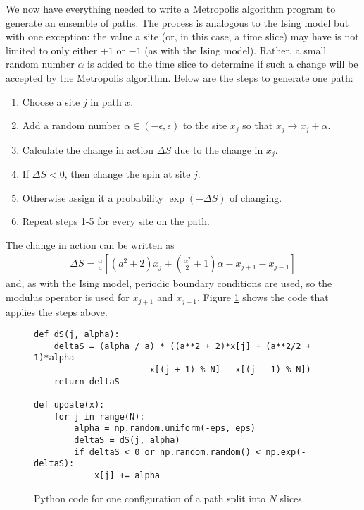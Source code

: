 \documentclass[11pt]{article}
\begin{document}
We now have everything needed to write a Metropolis algorithm program to generate an ensemble of paths. The process is analogous to the Ising model but with one exception: the value a site (or, in this case, a time slice) may have is not limited to only either $+1$ or $-1$ (as with the Ising model). Rather, a small random number $\alpha$ is added to the time slice to determine if such a change will be accepted by the Metropolis algorithm. Below are the steps to generate one path:
\begin{enumerate}
\item Choose a site $j$ in path $x$.
\item Add a random number $\alpha\in(-\epsilon,\epsilon)$ to the site $x_j$ so that $x_j\to x_j+\alpha$.
\item Calculate the change in action $\Delta S$ due to the change in $x_j$.
\item If $\Delta S<0$, then change the spin at site $j$.
\item Otherwise assign it a probability $\exp(-\Delta S)$ of changing.
\item Repeat steps 1-5 for every site on the path.
\end{enumerate}
The change in action can be written as
\begin{align}
	\Delta S= \frac{\alpha}{a}\left[(a^2+2)x_j+\left(\frac{\alpha^2}{2}+1\right)\alpha-x_{j+1}-x_{j-1}\right]
\end{align}
and, as with the Ising model, periodic boundary conditions are used, so the modulus operator is used for $x_{j+1}$ and $x_{j-1}$. Figure \ref{fig:PathCode} shows the code that applies the steps above.
\begin{figure}[h]
\begin{lstlisting}
def dS(j, alpha):
    deltaS = (alpha / a) * ((a**2 + 2)*x[j] + (a**2/2 + 1)*alpha
    				 - x[(j + 1) % N] - x[(j - 1) % N])
    return deltaS

def update(x):
    for j in range(N):
        alpha = np.random.uniform(-eps, eps)
        deltaS = dS(j, alpha)        
        if deltaS < 0 or np.random.random() < np.exp(-deltaS):    
            x[j] += alpha
\end{lstlisting}
    \caption{Python code for one configuration of a path split into $N$ slices.}
\label{fig:PathCode}
\end{figure}
\end{document}
